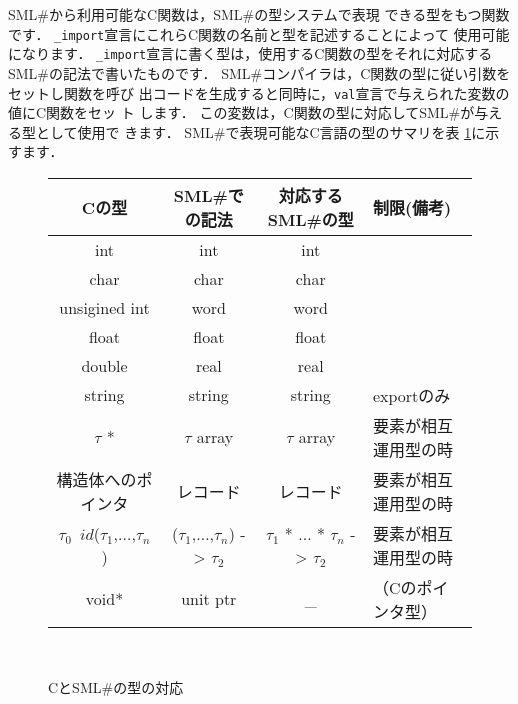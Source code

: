 \documentclass{jbook}
\newcommand{\smlsharp}{SML\#}
\begin{document}

	\smlsharp{}から利用可能なC関数は，\smlsharp{}の型システムで表現
できる型をもつ関数です．
	{\tt \_import}宣言にこれらC関数の名前と型を記述することによって
使用可能になります．
	{\tt \_import}宣言に書く型は，使用するC関数の型をそれに対応する
\smlsharp{}の記法で書いたものです．
	\smlsharp{}コンパイラは，C関数の型に従い引数をセットし関数を呼び
出コードを生成すると同時に，{\tt val}宣言で与えられた変数の値にC関数をセッ
ト
します．
	この変数は，C関数の型に対応して\smlsharp{}が与える型として使用で
きます．
	\smlsharp{}で表現可能なC言語の型のサマリを表
\ref{fig:interoperableType}に示すます．
\begin{figure}
\begin{center}
\begin{tabular}{|c|c|c|l|}
\hline
Cの型 & \smlsharp{}での記法 & 対応する\smlsharp{}の型 & 制限(備考)
\\ \hline
int & int & int & 
\\
char & char &char &
\\
unsigined int & word &word &
\\
float & float &float &
\\
double & real &real &
\\
string & string &string & exportのみ
\\
$\tau$ * & $\tau$ array & $\tau$ array & 要素が相互運用型の時
\\
構造体へのポインタ & レコード & レコード & 要素が相互運用型の時
\\
$\tau_0$\ $id$($\tau_1$,$\ldots$,$\tau_n$) & 
($\tau_1$,$\ldots$,$\tau_n$) -> $\tau_2$ & 
$\tau_1$ * $\ldots$ * $\tau_n$ -> $\tau_2$ & 
要素が相互運用型の時
\\
void* & unit ptr & \_ & （Cのポインタ型）
\\\hline
\end{tabular}\\
\caption{Cと\smlsharp{}の型の対応}
\label{fig:interoperableType}
\end{center}
\end{figure}
\end{document}
